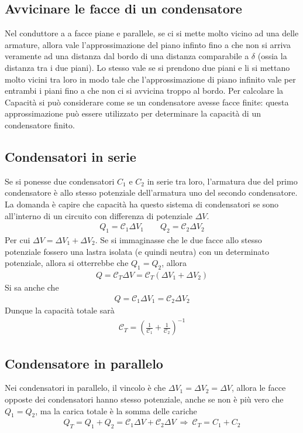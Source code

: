 \documentclass[a4paper, oneside]{article}
\begin{document}
\subsection{Avvicinare le facce di un condensatore}
Nel conduttore a a facce piane e parallele, se ci si mette molto vicino ad una 
delle armature, allora vale l'approssimazione del piano infinto fino a che non si arriva veramente ad una distanza
dal bordo di una distanza comparabile a $\delta$ (ossia la distanza tra i due piani). Lo stesso vale se si prendono due 
piani e li si mettano molto vicini tra loro in modo tale che l'approssimazione di piano infinito
vale per entrambi i piani fino a che non ci si avvicina troppo al bordo. Per calcolare la Capacità 
si può considerare come se un condensatore avesse facce finite: questa approssimazione può 
essere utilizzato per determinare la capacità di un condensatore finito.

\subsection{Condensatori in serie}
Se si ponesse due condensatori $C_1$ e $C_2$ in serie tra loro, l'armatura
due del primo condensatore è allo stesso potenziale dell'armatura uno del secondo condensatore.
La domanda è capire che capacità ha questo sistema di condensatori 
se sono all'interno di un circuito con differenza di potenziale $\Delta V$.
\begin{gather*}
    Q_1 = \mathcal{C}_1 \Delta V_1 \qquad Q_2 = \mathcal{C}_2 \Delta V_2
\end{gather*}
Per cui $\Delta V = \Delta V_1 + \Delta V_2$. Se si immaginasse che le due facce allo stesso 
potenziale fossero una lastra isolata (e quindi neutra) con un determinato potenziale, allora si otterrebbe 
che $Q_1 = Q_2$, allora
\begin{gather*}
    Q = \mathcal{C}_T \Delta V = \mathcal{C}_T (\Delta V_1 + \Delta V_2)
\end{gather*}
Si sa anche che 
\begin{gather*}
    Q = \mathcal{C}_1 \Delta V_1 = \mathcal{C}_2 \Delta V_2
\end{gather*}
Dunque la capacità totale sarà
\begin{gather*}
    \mathcal{C}_T = \left(\frac{1}{\mathcal{C}_1} + \frac{1}{\mathcal{C}_2}\right)^{-1}
\end{gather*}

\subsection{Condensatore in parallelo}
Nei condensatori in parallelo, il vincolo è che $\Delta V_1 = \Delta V_2 = \Delta V$, allora 
le facce opposte dei condensatori hanno stesso potenziale, anche se non è più vero che
$Q_1 = Q_2$, ma la carica totale è la somma delle cariche
\begin{gather*}
    Q_T = Q_1 + Q_2 = \mathcal{C}_1\Delta V + \mathcal{C}_2 \Delta V \ \Longrightarrow \ \mathcal{C}_T = C_1 + C_2
\end{gather*}
\end{document}
